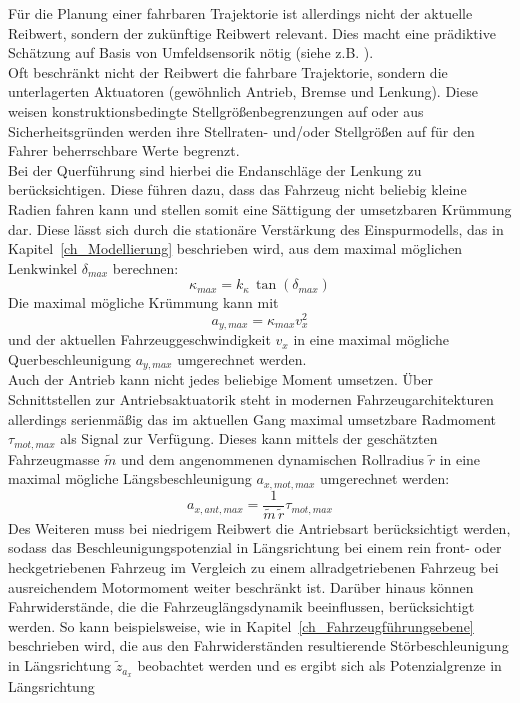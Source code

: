 Für die Planung einer fahrbaren Trajektorie ist allerdings nicht der aktuelle Reibwert, sondern der zukünftige Reibwert relevant. Dies macht eine prädiktive Schätzung auf Basis von Umfeldsensorik nötig (siehe z.B. \cite{daniel2014reibwertschaetzung}).\\
Oft beschränkt nicht der Reibwert die fahrbare Trajektorie, sondern die unterlagerten Aktuatoren (gewöhnlich Antrieb, Bremse und Lenkung). Diese weisen konstruktionsbedingte Stellgrößenbegrenzungen auf oder aus Sicherheitsgründen werden ihre Stellraten- und/oder Stellgrößen auf für den Fahrer beherrschbare Werte begrenzt.\\
Bei der Querführung sind hierbei die Endanschläge der Lenkung zu berücksichtigen. Diese führen dazu, dass das Fahrzeug nicht beliebig kleine Radien fahren kann und stellen somit eine Sättigung der umsetzbaren Krümmung dar. Diese lässt sich durch die stationäre Verstärkung des Einspurmodells, das in Kapitel~\ref{ch_Modellierung} beschrieben wird, aus dem maximal möglichen Lenkwinkel $\delta_{max}$ berechnen:
\begin{equation}
\kappa_{max}=k_\kappa \, \tan \left(\delta_{max}\right) 
\end{equation}
Die maximal mögliche Krümmung kann mit 
\begin{equation}
a_{y,max} = \kappa_{max} v_x^2 
\end{equation}
und der aktuellen Fahrzeuggeschwindigkeit $v_x$ in eine maximal mögliche Querbeschleunigung $a_{y,max}$ umgerechnet werden.
\\ 
Auch der Antrieb kann nicht jedes beliebige Moment umsetzen. Über Schnittstellen zur Antriebsaktuatorik steht in modernen Fahrzeugarchitekturen allerdings serienmäßig das im aktuellen Gang maximal umsetzbare Radmoment $\tau_{mot,max}$ als Signal zur Verfügung. Dieses kann mittels der geschätzten Fahrzeugmasse $\tilde m$ und dem angenommenen dynamischen Rollradius $\tilde r$ in eine maximal mögliche Längsbeschleunigung $a_{x,mot,max}$ umgerechnet werden:
\begin{equation}
a_{x,ant,max} = \frac{1}{\tilde m \, \tilde r} \tau_{mot,max} 
\end{equation}
Des Weiteren muss bei niedrigem Reibwert die Antriebsart berücksichtigt werden, sodass das Beschleunigungspotenzial in Längsrichtung  bei einem rein front- oder heckgetriebenen Fahrzeug im Vergleich zu einem allradgetriebenen Fahrzeug bei ausreichendem Motormoment weiter beschränkt ist. Darüber hinaus können Fahrwiderstände, die die Fahrzeuglängsdynamik beeinflussen, berücksichtigt werden. So kann beispielsweise, wie in Kapitel~\ref{ch_Fahrzeugführungsebene} beschrieben wird, die aus den Fahrwiderständen resultierende Störbeschleunigung in Längsrichtung $\tilde z_{a_x}$ beobachtet werden und es ergibt sich als Potenzialgrenze in Längsrichtung
